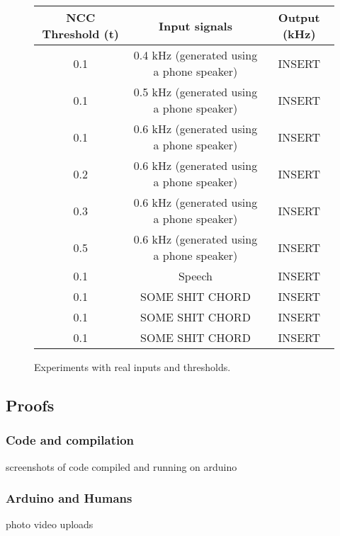 \begin{figure}[ht]
    \centering
    \def\arraystretch{1.5}
    \setlength\tabcolsep{2em}
    \begin{tabular}{c | c | c}
        NCC Threshold (t)   & Input signals                                 & Output (kHz) \\ \hline
        0.1                 & 0.4 kHz (generated using a phone speaker)     & INSERT \\   
        0.1                 & 0.5 kHz (generated using a phone speaker)     & INSERT \\   
        0.1                 & 0.6 kHz (generated using a phone speaker)     & INSERT \\   
        0.2                 & 0.6 kHz (generated using a phone speaker)     & INSERT \\   
        0.3                 & 0.6 kHz (generated using a phone speaker)     & INSERT \\   
        0.5                 & 0.6 kHz (generated using a phone speaker)     & INSERT \\   
        0.1                 & Speech                                        & INSERT \\   
        0.1                 & SOME SHIT CHORD                               & INSERT \\   
        0.1                 & SOME SHIT CHORD                               & INSERT \\   
        0.1                 & SOME SHIT CHORD                               & INSERT \\   
    \end{tabular}
    \captionsetup{justification=centering}
    \caption{Experiments with real inputs and thresholds.}
    \label{fig:realexp}

\end{figure}

\subsection{Proofs}

\subsubsection{Code and compilation}

screenshots of code compiled and running on arduino

\subsubsection{Arduino and Humans}

photo video uploads